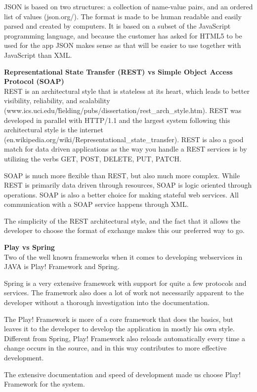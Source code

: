 \documentclass[11pt]{book}
\begin{document}
JSON is based on two structures: a collection of name-value pairs, and an ordered list of values (json.org/). The format is made to be human readable and easily parsed and created by computers. It is based on a subset of the JavaScript programming language, and because the customer has asked for HTML5 to be used for the app JSON makes sense as that will be easier to use together with JavaScript than XML.

\textbf{Representational State Transfer (REST) vs Simple Object Access Protocol (SOAP)}\\
REST is an architectural style that is stateless at its heart, which leads to better visibility, reliability, and scalability (www.ics.uci.edu/\~fielding/pubs/dissertation/rest\_arch\_style.htm). REST was developed in parallel with HTTP/1.1 and the largest system following this architectural style is the internet (en.wikipedia.org/wiki/Representational\_state\_transfer). REST is also a good match for data driven applications as the way you handle a REST services is by utilizing the verbs GET, POST, DELETE, PUT, PATCH.

SOAP is much more flexible than REST, but also much more complex. While REST is primarily data driven through resources, SOAP is logic oriented through operations. SOAP is also a better choice for making stateful web services. All communication with a SOAP service happens through XML.

The simplicity of the REST architectural style, and the fact that it allows the developer to choose the format of exchange makes this our preferred way to go.

\textbf{Play vs Spring}\\
Two of the well known frameworks when it comes to developing webservices in JAVA is Play! Framework and Spring.

Spring is a very extensive framework with support for quite a few protocols and services. The framework also does a lot of work not necessarily apparent to the developer without a thorough investigation into the documentation.

The Play! Framework is more of a core framework that does the basics, but leaves it to the developer to develop the application in mostly his own style. Different from Spring, Play! Framework also reloads automatically every time a change occurs in the source, and in this way contributes to more effective development.

The extensive documentation and speed of development made us choose Play! Framework for the system.
\end{document}
